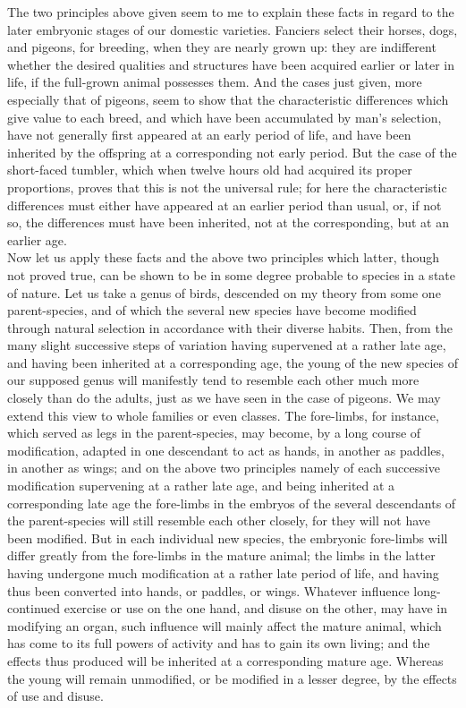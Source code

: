 \indent The two principles above given seem to me to explain these facts in regard to the later embryonic stages of our domestic varieties. Fanciers select their horses, dogs, and pigeons, for breeding, when they are nearly grown up: they are indifferent whether the desired qualities and structures have been acquired earlier or later in life, if the full-grown animal possesses them. And the cases just given, more especially that of pigeons, seem to show that the characteristic differences which give value to each breed, and which have been accumulated by man's selection, have not generally first appeared at an early period of life, and have been inherited by the offspring at a corresponding not early period. But the case of the short-faced tumbler, which when twelve hours old had acquired its proper proportions, proves that this is not the universal rule; for here the characteristic differences must either have appeared at an earlier period than usual, or, if not so, the differences must have been inherited, not at the corresponding, but at an earlier age.~\\
\indent Now let us apply these facts and the above two principles which latter, though not proved true, can be shown to be in some degree probable to species in a state of nature. Let us take a genus of birds, descended on my theory from some one parent-species, and of which the several new species have become modified through natural selection in accordance with their diverse habits. Then, from the many slight successive steps of variation having supervened at a rather late age, and having been inherited at a corresponding age, the young of the new species of our supposed genus will manifestly tend to resemble each other much more closely than do the adults, just as we have seen in the case of pigeons. We may extend this view to whole families or even classes. The fore-limbs, for instance, which served as legs in the parent-species, may become, by a long course of modification, adapted in one descendant to act as hands, in another as paddles, in another as wings; and on the above two principles namely of each successive modification supervening at a rather late age, and being inherited at a corresponding late age the fore-limbs in the embryos of the several descendants of the parent-species will still resemble each other closely, for they will not have been modified. But in each individual new species, the embryonic fore-limbs will differ greatly from the fore-limbs in the mature animal; the limbs in the latter having undergone much modification at a rather late period of life, and having thus been converted into hands, or paddles, or wings. Whatever influence long-continued exercise or use on the one hand, and disuse on the other, may have in modifying an organ, such influence will mainly affect the mature animal, which has come to its full powers of activity and has to gain its own living; and the effects thus produced will be inherited at a corresponding mature age. Whereas the young will remain unmodified, or be modified in a lesser degree, by the effects of use and disuse.~\\

